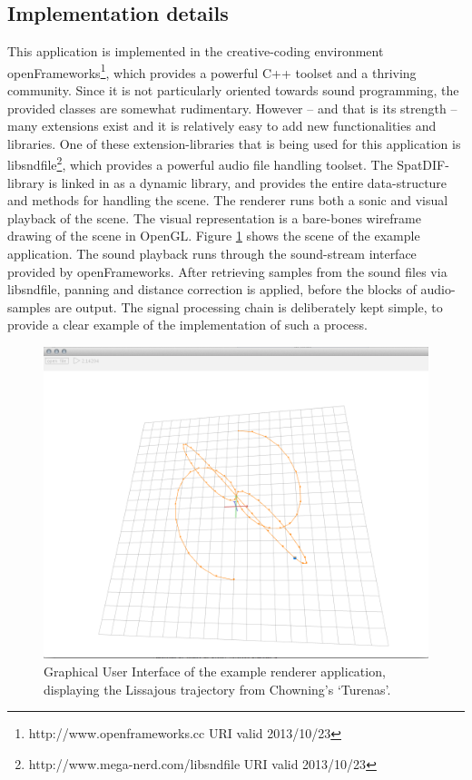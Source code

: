 \documentclass[a4paper]{article}
\begin{document}
\subsection{Implementation details}

This application is implemented in the creative-coding environment openFrameworks\footnote{http://www.openframeworks.cc URI valid 2013/10/23}, which provides a powerful C++ toolset and a thriving community.
Since it is not particularly oriented towards sound programming, the provided classes are somewhat rudimentary.
However -- and that is its strength -- many extensions exist and it is relatively easy to add new functionalities and libraries.
One of these extension-libraries that is being used for this application is libsndfile\footnote{http://www.mega-nerd.com/libsndfile URI valid 2013/10/23}, which provides a powerful audio file handling toolset.
The SpatDIF-library is linked in as a dynamic library, and provides the entire data-structure and methods for handling the scene.
The renderer runs both a sonic and visual playback of the scene.
The visual representation is a bare-bones wireframe drawing of the scene in OpenGL.
Figure \ref{fig:screenshot} shows the scene of the example application.
The sound playback runs through the sound-stream interface provided by openFrameworks.
After retrieving samples from the sound files via libsndfile, panning and distance correction is applied, before the blocks of audio-samples are output.
The signal processing chain is deliberately kept simple, to provide a clear example of the implementation of such a process.

\begin{figure}[h]
\centerline{
	\includegraphics[width=\columnwidth]{SpatDIFrenderer_screenshot2}}
\caption{Graphical User Interface of the example renderer application, displaying the Lissajous trajectory from Chowning's `Turenas'. 
}
\label{fig:screenshot}
\end{figure}
\end{document}
